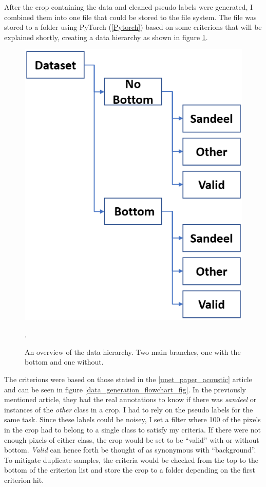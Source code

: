         After the crop containing the data and cleaned pseudo labels were generated, I combined them into one file that could be stored to the file system. The file was stored to a folder using PyTorch (\ref{Pytorch}) based on some criterions that will be explained shortly, creating a data hierarchy as shown in figure \ref{data_hierarchy_fig}.
        
        
        \begin{figure}[H]
            \centering
            \includegraphics[scale=0.5]{figures/data_hierarki.png}
            \caption[The data-hierarchy]{An overview of the data hierarchy. Two main branches, one with the bottom and one without.}.
          	\medskip 
            \label{data_hierarchy_fig}
        \end{figure}
        
        The criterions were based on those stated in the \ref{unet_paper_acoustic} article and can be seen in figure \ref{data_generation_flowchart_fig}. In the previously mentioned article, they had the real annotations to know if there was \textit{sandeel} or instances of the \textit{other} class in a crop. I had to rely on the pseudo labels for the same task. Since these labels could be noisey, I set a filter where 100 of the pixels in the crop had to belong to a single class to satisfy my criteria. If there were not enough pixels of either class, the crop would be set to be “valid” with or without bottom. \textit{Valid} can hence forth be thought of as synonymous with “background”. To mitigate duplicate samples, the criteria would be checked from the top to the bottom of the criterion list and store the crop to a folder depending on the first criterion hit.
        
